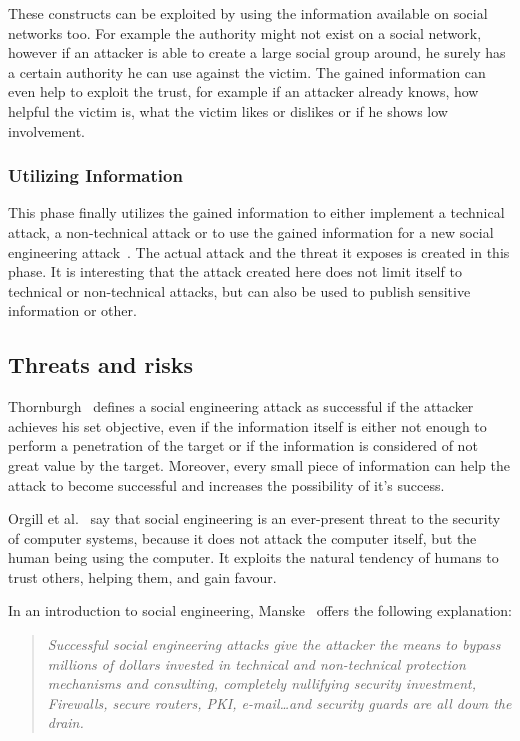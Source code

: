 These constructs can be exploited by using the information available on social
networks too. For example the authority might not exist on a social network,
however if an attacker is able to create a large social group around, he surely
has a certain authority he can use against the victim. The gained information
can even help to exploit the trust, for example if an attacker already knows,
how helpful the victim is, what the victim likes or dislikes or if he shows low
involvement.

\subsubsection{Utilizing Information}

This phase finally utilizes the gained information to either implement a
technical attack, a non-technical attack or to use the gained information for a
new social engineering attack~\cite{thornburgh2004}. The actual attack and the
threat it exposes is created in this phase. It is interesting that the attack
created here does not limit itself to technical or non-technical attacks, but
can also be used to publish sensitive information or other.

\subsection{Threats and risks}

Thornburgh~\cite{thornburgh2004} defines a social engineering attack as
successful if the attacker achieves his set objective, even if the information itself
is either not enough to perform a penetration of the target or if the
information is considered of not great value by the target. Moreover, every
small piece of information can help the attack to become successful and increases the
possibility of it's success.

Orgill et al.~\cite{orgill2004} say that social engineering is an ever-present
threat to the security of computer systems, because it does not attack the
computer itself, but the human being using the computer. It exploits the
natural tendency of humans to trust others, helping them, and gain favour.

In an introduction to social engineering, Manske~\cite{manske2000} offers the
following explanation:

\begin{quote}
\textit{Successful social engineering attacks give the attacker the means to bypass
millions of dollars invested in technical and non-technical protection
mechanisms and consulting, completely nullifying security investment,
Firewalls, secure routers, PKI, e-mail\dots and security guards are all down
the drain.}
\end{quote}

